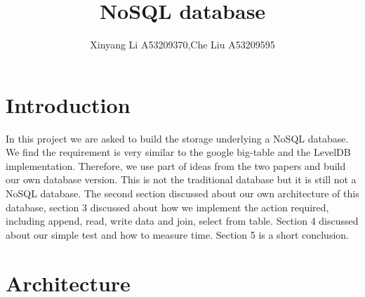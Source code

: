 \documentclass[a4paper]{article}
\title{NoSQL database}
\author{Xinyang Li A53209370,Che Liu A53209595}
\date{}
\begin{document}
\maketitle %
\section{Introduction}
In this project we are asked to build the storage underlying a NoSQL database. We find the requirement is very similar to the google big-table and the LevelDB implementation. Therefore, we use part of ideas from the two papers and build our own database version.
This is not the traditional database but it is still not a NoSQL database.
The second section discussed about our own architecture of this database, section 3 discussed about how we implement the action required, including append, read, write data and join, select from table. Section 4 discussed about our simple test and how to measure time. Section 5 is a short conclusion.
\section{Architecture}
\end{document}
